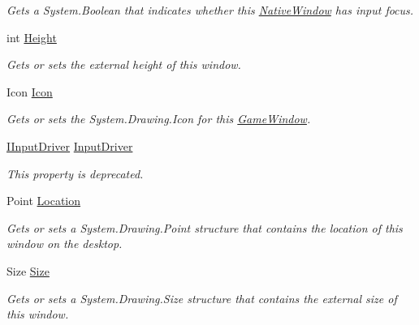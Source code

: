 \begin{DoxyCompactItemize}
\begin{DoxyCompactList}\small\item\em Gets a System.\-Boolean that indicates whether this \hyperlink{class_open_t_k_1_1_native_window}{Native\-Window} has input focus. \end{DoxyCompactList}\item 
int \hyperlink{class_open_t_k_1_1_native_window_afc84f4b20f80301bc41c3511763c3917}{Height}
\begin{DoxyCompactList}\small\item\em Gets or sets the external height of this window. \end{DoxyCompactList}\item 
Icon \hyperlink{class_open_t_k_1_1_native_window_a6cb12235c07f51662905a238baf65f2d}{Icon}
\begin{DoxyCompactList}\small\item\em Gets or sets the System.\-Drawing.\-Icon for this \hyperlink{class_open_t_k_1_1_game_window}{Game\-Window}. \end{DoxyCompactList}\item 
\hyperlink{interface_open_t_k_1_1_input_1_1_i_input_driver}{I\-Input\-Driver} \hyperlink{class_open_t_k_1_1_native_window_a9c19a3cff0a4f0ce60885c8dc6f4a89c}{Input\-Driver}
\begin{DoxyCompactList}\small\item\em This property is deprecated. \end{DoxyCompactList}\item 
Point \hyperlink{class_open_t_k_1_1_native_window_ab23cac873e75d052d5ccd7f9f709d80c}{Location}
\begin{DoxyCompactList}\small\item\em Gets or sets a System.\-Drawing.\-Point structure that contains the location of this window on the desktop. \end{DoxyCompactList}\item 
Size \hyperlink{class_open_t_k_1_1_native_window_a956be027bb7ba880507909d919b2ad6a}{Size}
\begin{DoxyCompactList}\small\item\em Gets or sets a System.\-Drawing.\-Size structure that contains the external size of this window. \end{DoxyCompactList}\item 

\end{DoxyCompactItemize}
